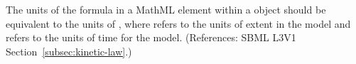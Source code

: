 The units of the formula in a MathML  element within a
\KineticLaw object should be equivalent to the units of , where  refers to the units of extent in the
model and  refers to the units of time for the model.
(References: SBML L3V1 Section~\ref{subsec:kinetic-law}.)
